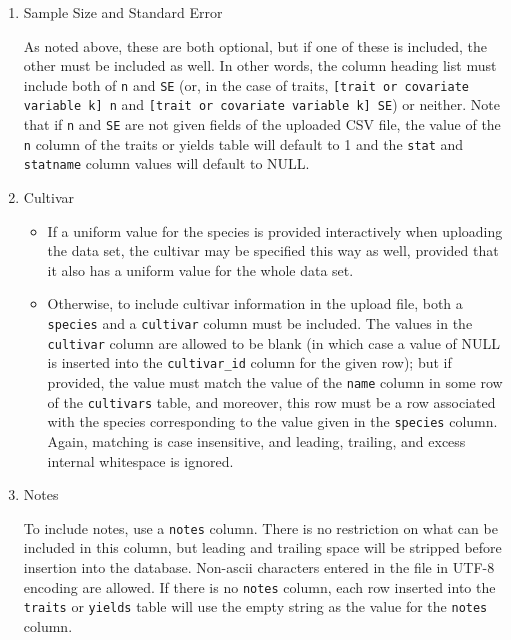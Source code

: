 \begin{enumerate}
\item Sample Size and Standard Error

  As noted above, these are both optional, but if one of these is
   included, the other must be included as well.  In other words, the
   column heading list must include both of \verb|n| and \verb|SE| (or, in the case of traits, \verb|[trait or covariate variable k] n| and \verb|[trait or covariate variable k] SE|) or neither.
   Note that if \verb|n| and \verb|SE| are not given fields of the uploaded CSV
   file, the value of the \verb|n| column of the traits or yields table will
   default to 1 and the \verb|stat| and \verb|statname| column values will default
   to NULL.
\item Cultivar

\begin{itemize}
\item If a uniform value for the species is provided interactively when
   uploading the data set, the cultivar may be specified this way as
   well, provided that it also has a uniform value for the whole data
   set.
\item Otherwise, to include cultivar information in the upload file, both a
   \verb|species| and a \verb|cultivar| column must be included.  The values in
   the \verb|cultivar| column are allowed to be blank (in which case a value
   of NULL is inserted into the \verb|cultivar_id| column for the given row);
   but if provided, the value must match the value of the \verb|name| column in
   some row of the \verb|cultivars| table, and moreover, this row must be a
   row associated with the species corresponding to the value given in
   the \verb|species| column.  Again, matching is case insensitive, and
   leading, trailing, and excess internal whitespace is ignored.
\end{itemize}

\item Notes

 To include notes, use a \verb|notes| column.  There is no restriction on
   what can be included in this column, but leading and trailing space
   will be stripped before insertion into the database.  Non-ascii
   characters entered in the file in UTF-8 encoding are allowed.  If
   there is no \verb|notes| column, each row inserted into the \verb|traits| or
   \verb|yields| table will use the empty string as the value for the \verb|notes|
   column.

   \end{enumerate}
